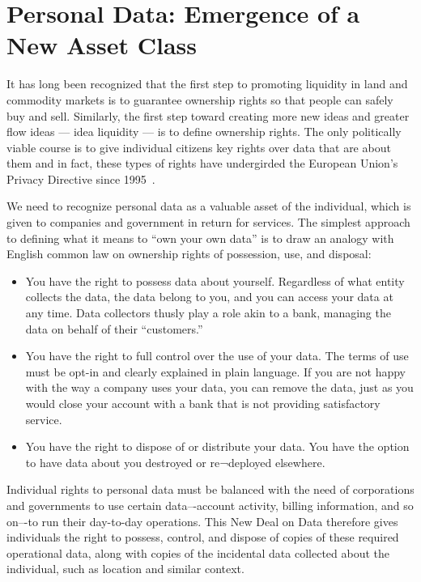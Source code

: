 \section{Personal Data: Emergence of a New Asset Class}

It has long been recognized that the first step to promoting liquidity in land and commodity markets is to guarantee ownership rights so that people can safely buy and sell.
Similarly, the first step toward creating more new ideas and greater flow ideas --- idea liquidity --- is to define ownership rights.
The only politically viable course is to give individual citizens key rights over data that are about them and in fact, these types of rights have undergirded the European Union's Privacy Directive since 1995~\cite{directive199595}.

We need to recognize personal data as a valuable asset of the individual, which is given to companies and government in return for services.
The simplest approach to defining what it means to “own your own data” is to draw an analogy with English common law on ownership rights of possession, use, and disposal:

\begin{itemize}
\item You have the right to possess data about yourself. Regardless of what entity collects the data, the data belong to you, and you can access your data at any time. Data collectors thusly play a role akin to a bank, managing the data on behalf of their “customers.”

\item You have the right to full control over the use of your data. The terms of use must be opt-in and clearly explained in plain language. If you are not happy with the way a company uses your data, you can remove the data, just as you would close your account with a bank that is not providing satisfactory service.

\item You have the right to dispose of or distribute your data. You have the option to have data about you destroyed or re¬deployed elsewhere.

\end{itemize}

Individual rights to personal data must be balanced with the need of corporations and governments to use certain data–-account activity, billing information, and so on–-to run their day-to-day operations.
This New Deal on Data therefore gives individuals the right to possess, control, and dispose of copies of these required operational data, along with copies of the incidental data collected about the individual, such as location and similar context.

